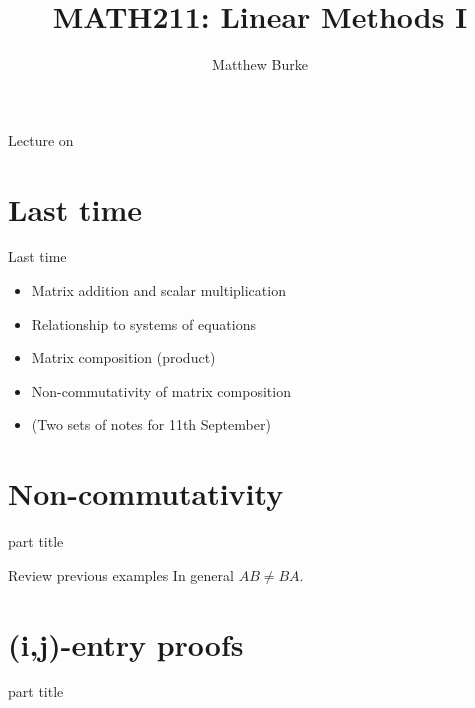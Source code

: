 \documentclass{beamer}
\title{MATH211: Linear Methods I}
\author{Matthew Burke}
\date{\lectureDate}
\newcommand{\lectureDate}{\formatdate{18}{09}{2018}}
\begin{document}
\frame{\titlepage}

\begin{frame}{Lecture on \lectureDate}
  \tableofcontents
\end{frame}

\section*{Last time}
\label{sec:Last-time}
\begin{frame}{Last time}
  \begin{itemize}
  \item Matrix addition and scalar multiplication\vfill
  \item Relationship to systems of equations\vfill
  \item Matrix composition (product)\vfill
  \item Non-commutativity of matrix composition\vfill
  \item (Two sets of notes for 11th September)
  \end{itemize}
\end{frame}

\section{Non-commutativity}

\begin{frame}
  \begin{beamercolorbox}[sep=12pt,center]{part title}
    \insertsection\par
  \end{beamercolorbox}
\end{frame}

\begin{frame}{Review previous examples}
  In general $AB \neq BA$.
\end{frame}

\section{(i,j)-entry proofs}

\begin{frame}
  \begin{beamercolorbox}[sep=12pt,center]{part title}
    \insertsection\par
  \end{beamercolorbox}
\end{frame}
\end{document}

